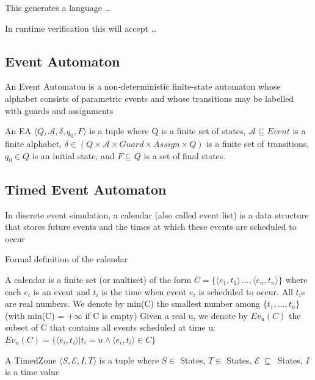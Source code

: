 			
			This generates a language \dots %
				
			In runtime verification this will accept \dots %
				
			
		
		\subsection{Event Automaton}
			An Event Automaton is a non-deterministic finite-state automaton whose alphabet consists
			of parametric events and whose transitions may be labelled with guards and assignments
			
			\begin{dfn}
				An EA
				$\langle Q,\mathcal{A},\delta, q_0, F \rangle$ is a tuple where Q is a finite set of states, 
				$\mathcal{A} \subseteq Event$ is a finite alphabet,
				$\delta \in (Q \times \mathcal{A} \times Guard \times Assign \times Q)$ is a finite set of transitions, 
				$q_0 \in Q$ is an initial state, and 
				$F \subseteq Q$ is a set of final states\citep{qea}.
			\end{dfn}
			
		\subsection{Timed Event Automaton}
			In discrete event simulation, a calendar (also called event list) is a data structure that
			stores future events and the times at which these events are scheduled to occur
			
			Formal definition of the calendar
				\begin{dfn}
				A calendar is a finite set (or multiset) of the form $C = \{ \langle e_1, t_1\rangle \, \dots ,\langle e_n, t_n\rangle \}$
				where each $e_i$ is an event and $t_i$ is the time when event $e_i$ is scheduled to occur. All $t_i$s are real numbers.
				We denote by min(C) the smallest number among $\{t_1,\dots ,t_n \}$ (with min(C) = $+\infty$ if C is empty)
				Given a real u, we denote by $Ev_u(C)$ the subset of C that contains all events scheduled at time u:
				$Ev_u(C) = \{ \langle e_i, t_i \rangle  | t_i = u \wedge \langle e_i , t_i \rangle \in C \} $
				\end{dfn}
				
			\begin{dfn}
				A TimedZone $\langle S,\mathcal{E},I,T \rangle $ is a tuple where $S \in$ States,
				$T \in$ States, 
				$\mathcal{E}~\subseteq$~States,
				$I$ is a time value 
			\end{dfn}
			
